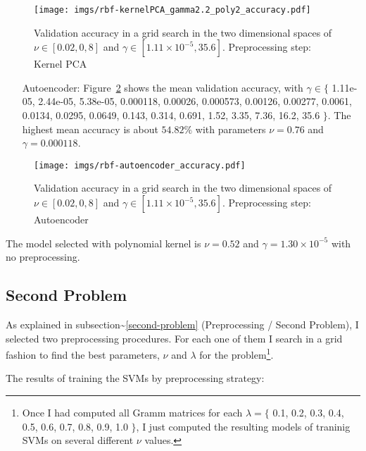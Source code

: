 \documentclass[format=acmtog]{acmart}
\begin{document}
\begin{figure}
\centering
\texttt{[image: imgs/rbf-kernelPCA\_gamma2.2\_poly2\_accuracy.pdf]}
\caption{Validation accuracy in a grid search in the two dimensional
spaces of \(\nu \in [0.02,0,8]\) and
\(\gamma \in [1.11\times{}10^{-5}, 35.6]\). Preprocessing step: Kernel
PCA \label{rbf-kernelPCA_gamma2.2_poly2_accuracy}}
\end{figure}

\begin{itemize}
  \item[Autoencoder:] Figure~\ref{rbf-autoencoder_accuracy} shows the mean validation accuracy,
  with $\gamma \in \{$ 1.11e-05, 2.44e-05, 5.38e-05, 0.000118, 0.00026, 0.000573, 0.00126,
  0.00277, 0.0061, 0.0134, 0.0295, 0.0649, 0.143, 0.314, 0.691, 1.52, 3.35, 7.36, 16.2,
  35.6 $\}$.
  The highest mean accuracy is about $54.82\%$ with parameters $\nu = 0.76$ and $\gamma = 0.000118$.
\end{itemize}

\begin{figure}
\centering
\texttt{[image: imgs/rbf-autoencoder\_accuracy.pdf]}
\caption{Validation accuracy in a grid search in the two dimensional
spaces of \(\nu \in [0.02,0,8]\) and
\(\gamma \in [1.11\times{}10^{-5}, 35.6]\). Preprocessing step:
Autoencoder \label{rbf-autoencoder_accuracy}}
\end{figure}

The model selected with polynomial kernel is \(\nu = 0.52\) and
\(\gamma = 1.30 \times 10^{-5}\) with no preprocessing.

\subsection{Second Problem}\label{second-problem-1}

As explained in subsection\textasciitilde{}\ref{second-problem}
(Preprocessing / Second Problem), I selected two preprocessing
procedures. For each one of them I search in a grid fashion to find the
best parameters, \(\nu\) and \(\lambda\) for the problem\footnote{Once I
  had computed all Gramm matrices for each \(\lambda = \{\) 0.1, 0.2,
  0.3, 0.4, 0.5, 0.6, 0.7, 0.8, 0.9, 1.0 \(\}\), I just computed the
  resulting models of traninig SVMs on several different \(\nu\) values.}.

The results of training the SVMs by preprocessing strategy:
\end{document}
